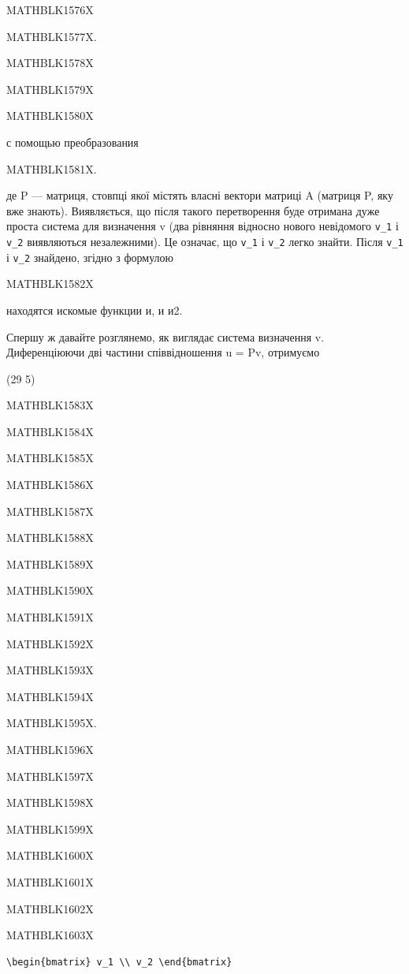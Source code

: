 \documentclass[
  ukrainian,
]{article}
\begin{document}
MATHBLK1576X

MATHBLK1577X.

MATHBLK1578X

MATHBLK1579X

MATHBLK1580X

с помощью преобразования

MATHBLK1581X.

де P --- матриця, стовпці якої містять власні вектори матриці A (матриця
P, яку вже знають). Виявляється, що після такого перетворення буде
отримана дуже проста система для визначення v (два рівняння відносно
нового невідомого \texttt{v\_1} і \texttt{v\_2} виявляються
незалежними). Це означає, що \texttt{v\_1} і \texttt{v\_2} легко знайти.
Після \texttt{v\_1} і \texttt{v\_2} знайдено, згідно з формулою

MATHBLK1582X

находятся искомые функции и, и и2.

Спершу ж давайте розглянемо, як виглядає система визначення v.
Диференціюючи дві частини співвідношення u = Pv, отримуємо

(29 5)

MATHBLK1583X

MATHBLK1584X

MATHBLK1585X

MATHBLK1586X

MATHBLK1587X

MATHBLK1588X

MATHBLK1589X

MATHBLK1590X

MATHBLK1591X

MATHBLK1592X

MATHBLK1593X

MATHBLK1594X

MATHBLK1595X.

MATHBLK1596X

MATHBLK1597X

MATHBLK1598X

MATHBLK1599X

MATHBLK1600X

MATHBLK1601X

MATHBLK1602X

MATHBLK1603X

\begin{verbatim}
\begin{bmatrix} v_1 \\ v_2 \end{bmatrix}
\end{verbatim}
\end{document}
